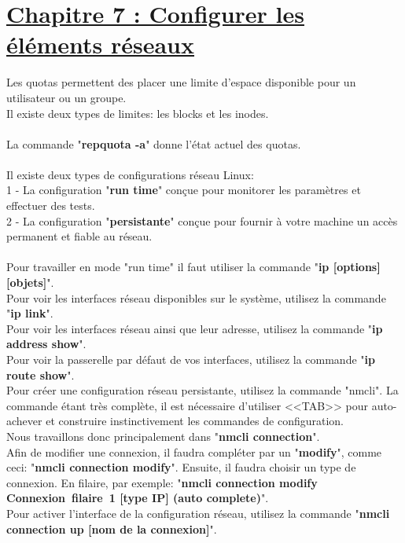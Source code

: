 \documentclass[12pt, a4paper]{article}
\begin{document}
\section*{\underline{Chapitre 7 : Configurer les éléments réseaux}}
Les quotas permettent des placer une limite d'espace disponible pour un utilisateur ou un groupe.\\
Il existe deux types de limites: les blocks et les inodes.\\
\\
La commande "\textbf{repquota -a}" donne l'état actuel des quotas.\\
\\
Il existe deux types de configurations réseau Linux:\\
1 - La configuration "\textbf{run time}" conçue pour monitorer les paramètres et effectuer des tests.\\
2 - La configuration "\textbf{persistante}" conçue pour fournir à votre machine un accès permanent et fiable au réseau.\\
\\
Pour travailler en mode "run time" il faut utiliser la commande "\textbf{ip [options] [objets]}".\\
Pour voir les interfaces réseau disponibles sur le système, utilisez la commande "\textbf{ip link}".\\
Pour voir les interfaces réseau ainsi que leur adresse, utilisez la commande "\textbf{ip address show}".\\
Pour voir la passerelle par défaut de vos interfaces, utilisez la commande "\textbf{ip route show}".\\
Pour créer une configuration réseau persistante, utilisez la commande "nmcli". La commande étant très complète, il est nécessaire d'utiliser <<TAB>> pour  auto-achever et construire instinctivement les commandes de configuration.\\
Nous travaillons donc principalement dans "\textbf{nmcli connection}".\\
\newpage\vspace*{1cm}
Afin de modifier une connexion, il faudra compléter par un "\textbf{modify}", comme ceci: "\textbf{nmcli connection modify}". Ensuite, il faudra choisir un type de connexion.
En filaire, par exemple: "\textbf{nmcli connection modify Connexion\ filaire\ 1 [type IP] (auto complete)}".\\
Pour activer l'interface de la configuration réseau, utilisez la commande "\textbf{nmcli connection up [nom de la connexion]}".\\
\end{document}
